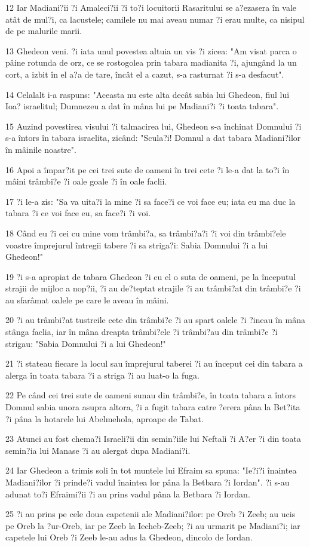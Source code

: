 \par 12 Iar Madiani?ii ?i Amaleci?ii ?i to?i locuitorii Rasaritului se a?ezasera în vale atât de mul?i, ca lacustele; camilele nu mai aveau numar ?i erau multe, ca nisipul de pe malurile marii.
\par 13 Ghedeon veni. ?i iata unul povestea altuia un vis ?i zicea: "Am visat parca o pâine rotunda de orz, ce se rostogolea prin tabara madianita ?i, ajungând la un cort, a izbit în el a?a de tare, încât el a cazut, s-a rasturnat ?i s-a desfacut".
\par 14 Celalalt i-a raspuns: "Aceasta nu este alta decât sabia lui Ghedeon, fiul lui Ioa? israelitul; Dumnezeu a dat în mâna lui pe Madiani?i ?i toata tabara".
\par 15 Auzind povestirea visului ?i talmacirea lui, Ghedeon s-a închinat Domnului ?i s-a întors în tabara israelita, zicând: "Scula?i! Domnul a dat tabara Madiani?ilor în mâinile noastre".
\par 16 Apoi a împar?it pe cei trei sute de oameni în trei cete ?i le-a dat la to?i în mâini trâmbi?e ?i oale goale ?i în oale faclii.
\par 17 ?i le-a zis: "Sa va uita?i la mine ?i sa face?i ce voi face eu; iata eu ma duc la tabara ?i ce voi face eu, sa face?i ?i voi.
\par 18 Când eu ?i cei cu mine vom trâmbi?a, sa trâmbi?a?i ?i voi din trâmbi?ele voastre împrejurul întregii tabere ?i sa striga?i: Sabia Domnului ?i a lui Ghedeon!"
\par 19 ?i s-a apropiat de tabara Ghedeon ?i cu el o suta de oameni, pe la începutul strajii de mijloc a nop?ii, ?i au de?teptat strajile ?i au trâmbi?at din trâmbi?e ?i au sfarâmat oalele pe care le aveau în mâini.
\par 20 ?i au trâmbi?at tustreile cete din trâmbi?e ?i au spart oalele ?i ?ineau în mâna stânga faclia, iar în mâna dreapta trâmbi?ele ?i trâmbi?au din trâmbi?e ?i strigau: "Sabia Domnului ?i a lui Ghedeon!"
\par 21 ?i stateau fiecare la locul sau împrejurul taberei ?i au început cei din tabara a alerga în toata tabara ?i a striga ?i au luat-o la fuga.
\par 22 Pe când cei trei sute de oameni sunau din trâmbi?e, în toata tabara a întors Domnul sabia unora asupra altora, ?i a fugit tabara catre ?erera pâna la Bet?ita ?i pâna la hotarele lui Abelmehola, aproape de Tabat.
\par 23 Atunci au fost chema?i Israeli?ii din semin?iile lui Neftali ?i A?er ?i din toata semin?ia lui Manase ?i au alergat dupa Madiani?i.
\par 24 Iar Ghedeon a trimis soli în tot muntele lui Efraim sa spuna: "Ie?i?i înaintea Madiani?ilor ?i prinde?i vadul înaintea lor pâna la Betbara ?i Iordan". ?i s-au adunat to?i Efraimi?ii ?i au prins vadul pâna la Betbara ?i Iordan.
\par 25 ?i au prins pe cele doua capetenii ale Madiani?ilor: pe Oreb ?i Zeeb; au ucis pe Oreb la ?ur-Oreb, iar pe Zeeb la Iecheb-Zeeb; ?i au urmarit pe Madiani?i; iar capetele lui Oreb ?i Zeeb le-au adus la Ghedeon, dincolo de Iordan.

